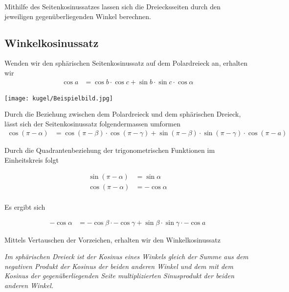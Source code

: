 \begin{refsection}
Mithilfe des Seitenkosinussatzes lassen sich die Dreiecksseiten durch den jeweiligen gegenüberliegenden Winkel berechnen.



\subsection{Winkelkosinussatz}

Wenden wir den sphärischen Seitenkosinussatz auf dem Polardreieck an, erhalten wir
\begin{align*}
{\cos a} &= {\cos b} \cdot {\cos c} + {\sin b} \cdot {\sin c} \cdot {\cos \alpha}
\end{align*}

\begin{center}
        \texttt{[image: kugel/Beispielbild.jpg]}
\end{center}

Durch die Beziehung zwischen dem Polardreieck und dem sphärischen Dreieck, lässt sich der Seitenkosinussatz folgendermassen umformen
\begin{align*}
{\cos (\pi-\alpha)} &= {\cos (\pi-\beta)} \cdot {\cos (\pi-\gamma)} + {\sin(\pi-\beta)} \cdot {\sin(\pi-\gamma)} \cdot {\cos (\pi-a)}
\end{align*}

Durch die Quadrantenbeziehung der trigonometrischen Funktionen im Einheitskreis folgt

\begin{align*}
\sin (\pi-\alpha) &= \sin \alpha\\
\cos (\pi-\alpha) &= - \cos \alpha\\
\end{align*}

Es ergibt sich

\begin{align*}
{-\cos \alpha} &= {-\cos \beta} \cdot {-\cos \gamma} + {\sin \beta} \cdot {\sin \gamma} \cdot {-\cos a}
\end{align*}

Mittels Vertauschen der Vorzeichen, erhalten wir den Winkelkosinussatz

\begin{satz}\textit{Im sphärischen Dreieck ist der Kosinus eines Winkels gleich der Summe aus dem negativen Produkt der Kosinus der beiden anderen Winkel und dem mit dem Kosinus der gegenüberliegenden Seite multiplizierten Sinusprodukt der beiden anderen Winkel.}
\label{skript:kugel:satz:Winkelkosinussatz}
\end{satz}


\end{refsection}
